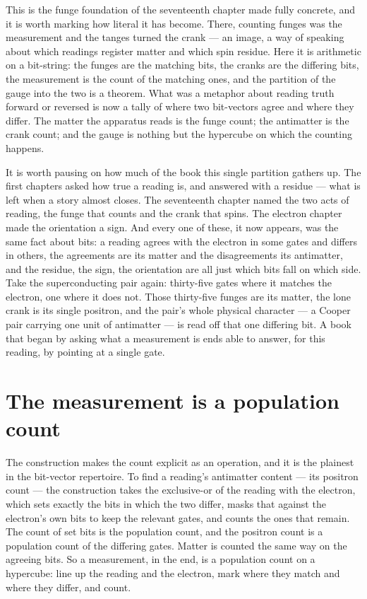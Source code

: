 This is the funge foundation of the seventeenth chapter made fully concrete, and it is worth marking how
literal it has become. There, counting funges was the measurement and the tanges turned the crank --- an
image, a way of speaking about which readings register matter and which spin residue. Here it is
arithmetic on a bit-string: the funges are the matching bits, the cranks are the differing bits, the
measurement is the count of the matching ones, and the partition of the gauge into the two is a theorem.
What was a metaphor about reading truth forward or reversed is now a tally of where two bit-vectors agree
and where they differ. The matter the apparatus reads is the funge count; the antimatter is the crank
count; and the gauge is nothing but the hypercube on which the counting happens.

It is worth pausing on how much of the book this single partition gathers up. The first chapters asked how
true a reading is, and answered with a residue --- what is left when a story almost closes. The
seventeenth chapter named the two acts of reading, the funge that counts and the crank that spins. The
electron chapter made the orientation a sign. And every one of these, it now appears, was the same fact
about bits: a reading agrees with the electron in some gates and differs in others, the agreements are its
matter and the disagreements its antimatter, and the residue, the sign, the orientation are all just which
bits fall on which side. Take the superconducting pair again: thirty-five gates where it matches the
electron, one where it does not. Those thirty-five funges are its matter, the lone crank is its single
positron, and the pair's whole physical character --- a Cooper pair carrying one unit of antimatter --- is
read off that one differing bit. A book that began by asking what a measurement is ends able to answer, for
this reading, by pointing at a single gate.

\section{The measurement is a population count}
\label{se:the-measurement-is-a-population-count}

The construction makes the count explicit as an operation, and it is the plainest in the bit-vector
repertoire. To find a reading's antimatter content --- its positron count --- the construction takes the
exclusive-or of the reading with the electron, which sets exactly the bits in which the two differ, masks
that against the electron's own bits to keep the relevant gates, and counts the ones that remain. The
count of set bits is the population count, and the positron count is a population count of the differing
gates. Matter is counted the same way on the agreeing bits. So a measurement, in the end, is a population
count on a hypercube: line up the reading and the electron, mark where they match and where they differ,
and count.

